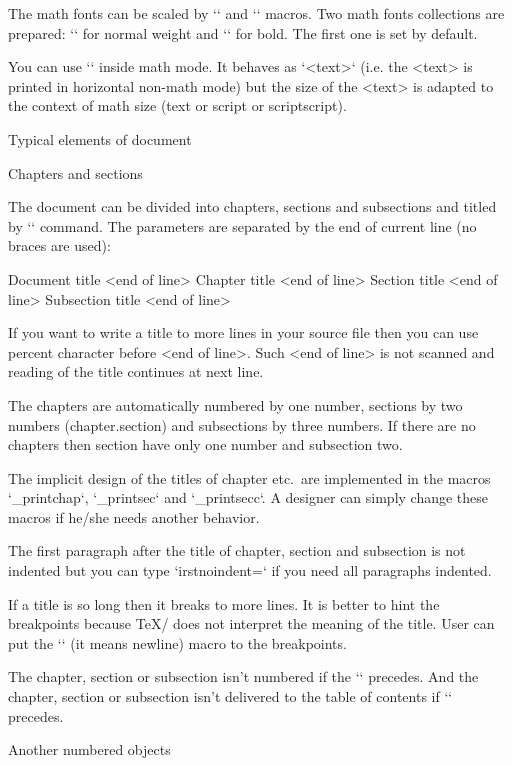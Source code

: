 The math fonts can be scaled by `\typosize` and `\typoscale` macros.
Two math fonts collections are prepared: `\normalmath` for normal weight
and `\boldmath` for bold. The first one is set by default.

\new
You can use `` inside math mode. It behaves as `{\hbox{<text>}}`
(i.e. the <text> is printed in horizontal non-math mode)
but the size of the <text> is adapted to the context of math size (text or script or
scriptscript). 


\sec Typical elements of document

\secc[chap] Chapters and sections

The document can be divided into chapters, sections and subsections and titled
by `\tit` command. The parameters are separated by the end of current line (no
braces are used):

\begtt
\tit Document title <end of line>
\chap Chapter title <end of line>
\sec Section title <end of line>
\secc Subsection title <end of line>
\endtt

If you want to write a title to more lines in your source file then you can
use percent character before <end of line>. Such <end of line> is not
scanned and reading of the title continues at next line.

The chapters are automatically numbered by one number, sections by two numbers
(chapter.section) and subsections by three numbers. If there are no chapters
then section have only one number and subsection two.

The implicit design of the titles of chapter etc.\ are implemented in the
macros `\_printchap`, `\_printsec` and `\_printsecc`. A designer can simply change
these macros if he/she needs another behavior.

The first paragraph after the title of chapter, section and subsection is
not indented but you can type `\let\_firstnoindent=\relax` if you need all
paragraphs indented.

If a title is so long then it breaks to more lines. It is better to hint the
breakpoints because \TeX/ does not interpret the meaning of the title.
User can put the `\nl` (it means newline) macro to the breakpoints.

The chapter, section or subsection isn't numbered if the `\nonum` precedes.
And the chapter, section or subsection isn't delivered to the table of
contents if `\notoc` precedes.

\secc[cap] Another numbered objects

